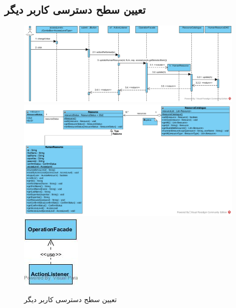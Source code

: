 \begin{landscape}
\newpage
\section{تعیین سطح دسترسی کاربر دیگر}
\begin{figure}[H]
	\centering
	\includegraphics[scale=0.55]{img/sequence-design/SetUserAccessLevel}
	\includegraphics[scale=0.6]{img/sequence-design/SetUserAccessLevelC}
	\includegraphics[scale=0.55]{img/sequence-design/SetUserAccessLevelUI}
	\caption{تعیین سطح دسترسی کاربر دیگر}
\end{figure}

\newpage

\end{landscape}
